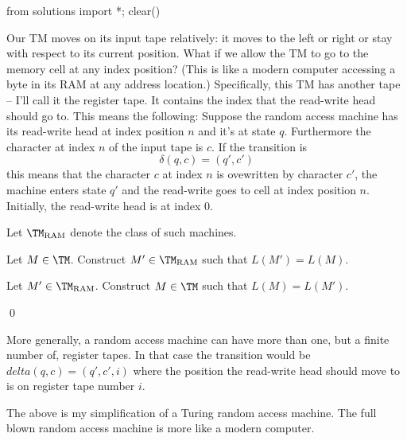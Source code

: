 \begin{python0}
from solutions import *; clear()
\end{python0}

Our TM moves on its input tape relatively: it moves to the left or right or
stay with respect to its current position.
What if we allow the TM to go to the memory cell at any index
position?
(This is like a modern computer accessing a byte in its RAM at
any address location.)
Specifically, this TM has another tape -- I'll call it the register tape.
It contains the index that the read-write head should go to.
This means the following:
Suppose the random access machine has its read-write head at index
position $n$ and it's at state $q$.
Furthermore the character at index $n$ of the input tape is $c$.
If the transition is
\[
\delta(q, c) = (q', c')
\]
this means that the character $c$ at index $n$ is ovewritten by character
$c'$, the machine enters state $q'$ and the read-write goes to
cell at index position $n$.
Initially, the read-write head is at index 0.

Let $\TM_{\operatorname{RAM}}$ denote the class of such machines.

\begin{ex}
  \begin{tightlist}
    \item Let $M \in \TM$. Construct $M' \in \TM_{\operatorname{RAM}}$
    such that $L(M') = L(M)$.
    \item Let $M' \in \TM_{\operatorname{RAM}}$.
    Construct $M \in \TM$ such that $L(M) = L(M')$.
  \end{tightlist}
\qed
\end{ex}

More generally, a random access machine can have more than one, but a
finite number of, register tapes.
In that case the transition would be $delta(q, c) = (q', c', i)$
where the position the read-write head should move to is on register
tape number $i$.

The above is my simplification of a Turing random access machine.
The full blown random access machine is more like a modern computer.

